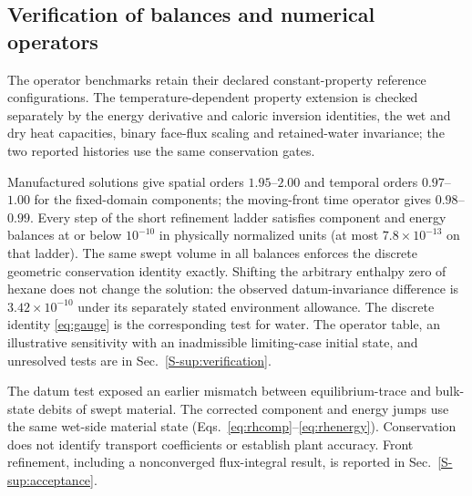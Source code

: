 \subsection{Verification of balances and numerical operators}
\label{sec:verification}
\label{sec:verification:table}
\label{sec:verification:notvalidation}
\label{sec:verification:donor}

The operator benchmarks retain their declared constant-property reference
configurations. The temperature-dependent property extension is checked
separately by the energy derivative and caloric inversion identities, the
wet and dry heat capacities, binary face-flux scaling and retained-water
invariance; the two reported histories use the same conservation gates.

Manufactured solutions give spatial orders $1.95$--$2.00$ and temporal
orders $0.97$--$1.00$ for the fixed-domain components; the moving-front
time operator gives $0.98$--$0.99$. Every step of the short refinement ladder satisfies
component and energy balances at
or below $10^{-10}$ in physically normalized units (at most
$7.8\times10^{-13}$ on that ladder). The same swept volume in all balances
enforces the discrete geometric conservation identity exactly. Shifting the
arbitrary enthalpy zero of hexane does not change the solution: the observed
datum-invariance difference is $3.42\times10^{-10}$ under its separately
stated environment allowance. The discrete identity
\eqref{eq:gauge} is the corresponding test for water.
The operator table, an illustrative sensitivity with an inadmissible
limiting-case initial state, and unresolved tests are in Sec.~\ref*{S-sup:verification}.

The datum test exposed an earlier mismatch between equilibrium-trace and
bulk-state debits of swept material. The corrected component and energy
jumps use the same wet-side material state
(Eqs.~\eqref{eq:rhcomp}--\eqref{eq:rhenergy}). Conservation does not identify
transport coefficients or establish plant accuracy. Front refinement,
including a nonconverged flux-integral result, is reported in
Sec.~\ref*{S-sup:acceptance}.

